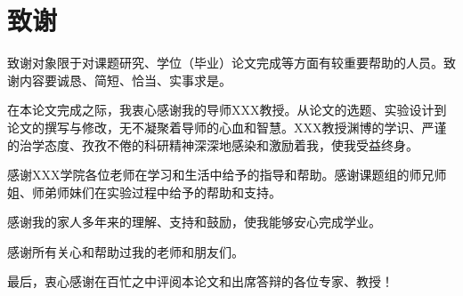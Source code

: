 
\chapter*{致谢}

致谢对象限于对课题研究、学位（毕业）论文完成等方面有较重要帮助的人员。致谢内容要诚恳、简短、恰当、实事求是。

在本论文完成之际，我衷心感谢我的导师XXX教授。从论文的选题、实验设计到论文的撰写与修改，无不凝聚着导师的心血和智慧。XXX教授渊博的学识、严谨的治学态度、孜孜不倦的科研精神深深地感染和激励着我，使我受益终身。

感谢XXX学院各位老师在学习和生活中给予的指导和帮助。感谢课题组的师兄师姐、师弟师妹们在实验过程中给予的帮助和支持。

感谢我的家人多年来的理解、支持和鼓励，使我能够安心完成学业。

感谢所有关心和帮助过我的老师和朋友们。

最后，衷心感谢在百忙之中评阅本论文和出席答辩的各位专家、教授！
